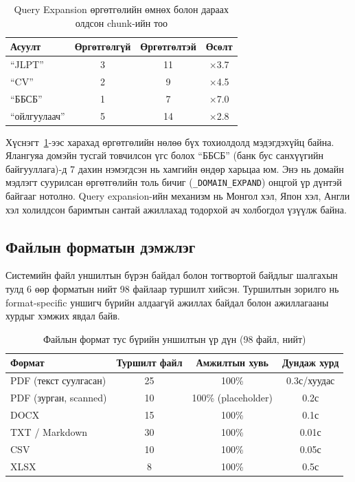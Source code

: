 \documentclass[11pt,a4paper]{article}
\begin{document}
\begin{table}[H]
\centering
\caption{Query Expansion өргөтгөлийн өмнөх болон дараах олдсон chunk-ийн тоо}
\label{tab:expansion_effect}
\begin{tabular}{|l|c|c|c|}
\hline
\textbf{Асуулт} & \textbf{Өргөтгөлгүй} & \textbf{Өргөтгөлтэй} & \textbf{Өсөлт} \\
\hline
``JLPT''       & 3  & 11 & $\times$3.7 \\
\hline
``CV''         & 2  & 9  & $\times$4.5 \\
\hline
``ББСБ''       & 1  & 7  & $\times$7.0 \\
\hline
``ойлгуулаач'' & 5  & 14 & $\times$2.8 \\
\hline
\end{tabular}
\end{table}

Хүснэгт~\ref{tab:expansion_effect}-ээс харахад өргөтгөлийн нөлөө бүх тохиолдолд мэдэгдэхүйц байна. Ялангуяа домэйн тусгай товчилсон үгс болох ``ББСБ'' (банк бус санхүүгийн байгууллага)-д 7 дахин нэмэгдсэн нь хамгийн өндөр харьцаа юм. Энэ нь домайн мэдлэгт суурилсан өргөтгөлийн толь бичиг (\texttt{\_DOMAIN\_EXPAND}) онцгой үр дүнтэй байгааг нотолно. Query expansion-ийн механизм нь Монгол хэл, Япон хэл, Англи хэл холилдсон баримтын сантай ажиллахад тодорхой ач холбогдол үзүүлж байна.

\subsection{Файлын форматын дэмжлэг}

Системийн файл уншилтын бүрэн байдал болон тогтвортой байдлыг шалгахын тулд 6 өөр форматын нийт 98 файлаар туршилт хийсэн. Туршилтын зорилго нь format-specific уншигч бүрийн алдаагүй ажиллах байдал болон ажиллагааны хурдыг хэмжих явдал байв.

\begin{table}[H]
\centering
\caption{Файлын формат тус бүрийн уншилтын үр дүн (98 файл, нийт)}
\label{tab:format_test}
\begin{tabular}{|l|c|c|c|}
\hline
\textbf{Формат} & \textbf{Туршилт файл} & \textbf{Амжилтын хувь} & \textbf{Дундаж хурд} \\
\hline
PDF (текст суулгасан)    & 25 & 100\% & 0.3с/хуудас \\
\hline
PDF (зурган, scanned)    & 10 & 100\% (placeholder) & 0.2с \\
\hline
DOCX                     & 15 & 100\% & 0.1с \\
\hline
TXT / Markdown           & 30 & 100\% & 0.01с \\
\hline
CSV                      & 10 & 100\% & 0.05с \\
\hline
XLSX                     & 8  & 100\% & 0.5с \\
\hline
\end{tabular}
\end{table}
\end{document}
